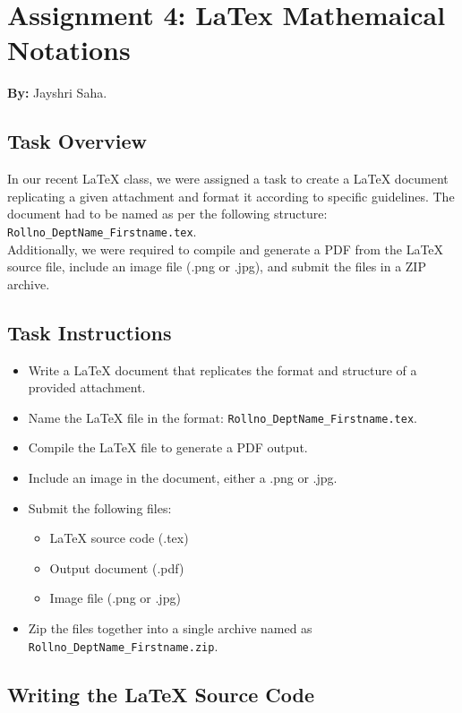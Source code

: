 \documentclass[a4paper,12pt]{article}
\begin{document}
\section{Assignment 4: LaTex Mathemaical Notations}
\textbf{By:} Jayshri Saha.


\subsection{Task Overview}

In our recent LaTeX class, we were assigned a task to create a LaTeX document replicating a given attachment and format it according to specific guidelines. The document had to be named as per the following structure:\\ \texttt{Rollno\_DeptName\_Firstname.tex}.\\ 
Additionally, we were required to compile and generate a PDF from the LaTeX source file, include an image file (.png or .jpg), and submit the files in a ZIP archive.

\subsection{Task Instructions}

\begin{itemize}
    \item Write a LaTeX document that replicates the format and structure of a provided attachment.
    \item Name the LaTeX file in the format: \texttt{Rollno\_DeptName\_Firstname.tex}.
    \item Compile the LaTeX file to generate a PDF output.
    \item Include an image in the document, either a .png or .jpg.
    \item Submit the following files:
    \begin{itemize}
        \item LaTeX source code (.tex)
        \item Output document (.pdf)
        \item Image file (.png or .jpg)
    \end{itemize}
    \item Zip the files together into a single archive named as \texttt{Rollno\_DeptName\_Firstname.zip}.
\end{itemize}

\subsection{Writing the LaTeX Source Code}
\end{document}
